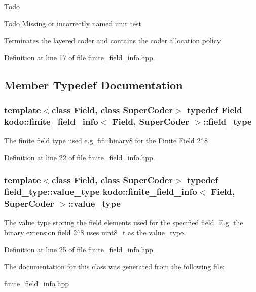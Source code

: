 \begin{DoxyRefDesc}{Todo}
\item[\hyperlink{todo__todo000018}{Todo}]Missing or incorrectly named unit test

Terminates the layered coder and contains the coder allocation policy \end{DoxyRefDesc}


Definition at line 17 of file finite\-\_\-field\-\_\-info.\-hpp.



\subsection{Member Typedef Documentation}
\hypertarget{classkodo_1_1finite__field__info_a7ca3137d048247ff0bc610876c790a5a}{
\subsubsection[{field\-\_\-type}]{\setlength{\rightskip}{0pt plus 5cm}template$<$class Field, class Super\-Coder$>$ typedef Field {\bf kodo\-::finite\-\_\-field\-\_\-info}$<$ Field, Super\-Coder $>$\-::{\bf field\-\_\-type}}}\label{classkodo_1_1finite__field__info_a7ca3137d048247ff0bc610876c790a5a}




The finite field type used e.\-g. fifi\-::binary8 for the Finite Field 2$^\wedge$8 

Definition at line 22 of file finite\-\_\-field\-\_\-info.\-hpp.

\hypertarget{classkodo_1_1finite__field__info_a3aeb5493ec7d3781415dbcbbbef5ef85}{
\subsubsection[{value\-\_\-type}]{\setlength{\rightskip}{0pt plus 5cm}template$<$class Field, class Super\-Coder$>$ typedef field\-\_\-type\-::value\-\_\-type {\bf kodo\-::finite\-\_\-field\-\_\-info}$<$ Field, Super\-Coder $>$\-::{\bf value\-\_\-type}}}\label{classkodo_1_1finite__field__info_a3aeb5493ec7d3781415dbcbbbef5ef85}




The value type storing the field elements used for the specified field. E.\-g. the binary extension field 2$^\wedge$8 uses uint8\-\_\-t as the value\-\_\-type. 

Definition at line 25 of file finite\-\_\-field\-\_\-info.\-hpp.



The documentation for this class was generated from the following file\-:\begin{DoxyCompactItemize}
\item 
finite\-\_\-field\-\_\-info.\-hpp\end{DoxyCompactItemize}
